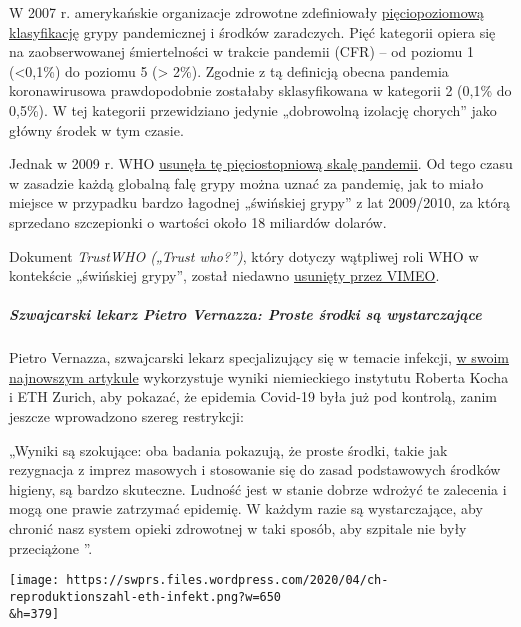 W 2007 r. amerykańskie organizacje zdrowotne zdefiniowały
\href{https://www.cidrap.umn.edu/news-perspective/2007/02/hhs-ties-pandemic-mitigation-advice-severity}{pięciopoziomową
klasyfikację} grypy pandemicznej i środków zaradczych. Pięć kategorii
opiera się na zaobserwowanej śmiertelności w trakcie pandemii (CFR) --
od poziomu 1 (\textless{}0,1\%) do poziomu 5 (\textgreater{} 2\%).
Zgodnie z tą definicją obecna pandemia koronawirusowa prawdopodobnie
zostałaby sklasyfikowana w kategorii 2 (0,1\% do 0,5\%). W tej kategorii
przewidziano jedynie „dobrowolną izolację chorych'' jako główny środek w
tym czasie.

Jednak w 2009 r. WHO
\href{https://www.forbes.com/2010/02/05/world-health-organization-swine-flu-pandemic-opinions-contributors-michael-fumento.html\#5ae32fb848e8}{usunęła
tę pięciostopniową skalę pandemii}. Od tego czasu w zasadzie każdą
globalną falę grypy można uznać za pandemię, jak to miało miejsce w
przypadku bardzo łagodnej „świńskiej grypy'' z lat 2009/2010, za którą
sprzedano szczepionki o wartości około 18 miliardów dolarów.

Dokument \emph{TrustWHO („Trust who?'')}, który dotyczy wątpliwej roli
WHO w kontekście „świńskiej grypy'', został niedawno
\href{https://www.youtube.com/watch?v=VjQGyqVN5RM}{usunięty przez
VIMEO}.

\hypertarget{szwajcarski-lekarz-pietro-vernazza-proste-ux15brodki-sux105-wystarczajux105ce}{%
\subparagraph{\texorpdfstring{\textbf{Szwajcarski lekarz Pietro
Vernazza: Proste środki są
wystarczające}}{Szwajcarski lekarz Pietro Vernazza: Proste środki są wystarczające}}\label{szwajcarski-lekarz-pietro-vernazza-proste-ux15brodki-sux105-wystarczajux105ce}}

Pietro Vernazza, szwajcarski lekarz specjalizujący się w temacie
infekcji,
\href{https://infekt.ch/2020/04/sind-wir-tatsaechlich-im-blindflug/}{w
swoim najnowszym artykule} wykorzystuje wyniki niemieckiego instytutu
Roberta Kocha i ETH Zurich, aby pokazać, że epidemia Covid-19 była już
pod kontrolą, zanim jeszcze wprowadzono szereg restrykcji:

„Wyniki są szokujące: oba badania pokazują, że proste środki, takie jak
rezygnacja z imprez masowych i stosowanie się do zasad podstawowych
środków higieny, są bardzo skuteczne. Ludność jest w stanie dobrze
wdrożyć te zalecenia i mogą one prawie zatrzymać epidemię. W każdym
razie są wystarczające, aby chronić nasz system opieki zdrowotnej w taki
sposób, aby szpitale nie były przeciążone ''.

\texttt{[image: https://swprs.files.wordpress.com/2020/04/ch-reproduktionszahl-eth-infekt.png?w=650\\\&h=379]}

